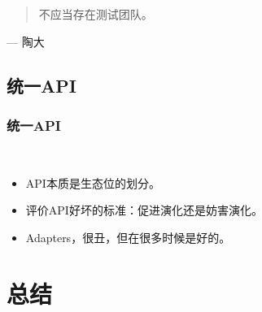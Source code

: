 \documentclass[UTF8,lualatex]{ctexbeamer}
\newcommand{\pagequote}[2]{
  \Large
  \begin{quotation}
      #1
  \end{quotation}
  \flushright\normalsize --- {#2}
}
\begin{document}
\begin{frame}
    \pagequote{
        不应当存在测试团队。}
        {陶大}
\end{frame}

\subsection{统一API}

\begin{frame}
    \frametitle{统一API}
    \begin{block}{~}
        \begin{itemize}
            \item API本质是生态位的划分。
            \item 评价API好坏的标准：促进演化还是妨害演化。
            \item Adapters，很丑，但在很多时候是好的。
        \end{itemize}
    \end{block}
\end{frame}


\section{总结}
\end{document}
